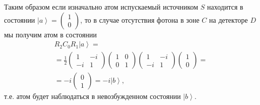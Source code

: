 Таким образом если изначально атом испускаемый источником $S$
находится в состоянии $\left|a\right> = \left(
\begin{array} {c}
1
\\
0
\end{array}
\right)$, то в случае отсутствия фотона в зоне $C$ на детекторе $D$ мы
получим атом в состоянии
\begin{eqnarray}
  R_2 C_0 R_1 \left|a\right> =
  \nonumber \\
  =
  \frac{1}{2}
  \left(
  \begin{array} {cc}
    1 & -i
    \\
    -i & 1 
  \end{array}
  \right)
  \left(
  \begin{array} {cc}
    1 & 0
    \\
    0 & 1 
  \end{array}
  \right)
  \left(
  \begin{array} {cc}
    1 & -i
    \\
    -i & 1 
  \end{array}
  \right)
  \left(
  \begin{array} {c}
    1
    \\
    0
  \end{array}
  \right) =
  \nonumber \\
  =
  -i 
  \left(
  \begin{array} {c}
    0
    \\
    1
  \end{array}
  \right) =
  -i \left|b\right>,
  \nonumber
\end{eqnarray}
т.е. атом будет наблюдаться в невозбужденном состоянии
$\left|b\right>$.

